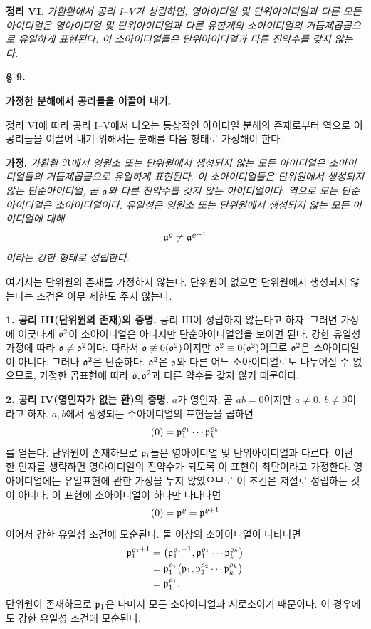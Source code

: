 \textbf{정리 VI.} \emph{가환환에서 공리 I--V가 성립하면, 영아이디얼 및 단위아이디얼과 다른 모든 아이디얼은 영아이디얼 및 단위아이디얼과 다른 유한개의 소아이디얼의 거듭제곱곱으로 유일하게 표현된다. 이 소아이디얼들은 단위아이디얼과 다른 진약수를 갖지 않는다.}

\begin{center}
{\bfseries\large § 9.\par}
\vspace{0.35em}
{\bfseries\large 가정한 분해에서 공리들을 이끌어 내기.\par}
\end{center}

정리 VI에 따라 공리 I--V에서 나오는 통상적인 아이디얼 분해의 존재로부터 역으로 이 공리들을 이끌어 내기 위해서는 분해를 다음 형태로 가정해야 한다.

\textbf{가정.} \emph{가환환 \(\mathfrak{R}\)에서 영원소 또는 단위원에서 생성되지 않는 모든 아이디얼은 소아이디얼들의 거듭제곱곱으로 유일하게 표현된다. 이 소아이디얼들은 단위원에서 생성되지 않는 단순아이디얼, 곧 \(\mathfrak{o}\)와 다른 진약수를 갖지 않는 아이디얼이다. 역으로 모든 단순아이디얼은 소아이디얼이다. 유일성은 영원소 또는 단위원에서 생성되지 않는 모든 아이디얼에 대해}
\[
        \mathfrak{a}^\varrho\ne\mathfrak{a}^{\varrho+1}
\]
\emph{이라는 강한 형태로 성립한다.}

여기서는 단위원의 존재를 가정하지 않는다. 단위원이 없으면 \glqq{}단위원에서 생성되지 않는다\grqq{}는 조건은 아무 제한도 주지 않는다.

\textbf{1. 공리 III(단위원의 존재)의 증명.} 공리 III이 성립하지 않는다고 하자. 그러면 가정에 어긋나게 \(\mathfrak{o}^2\)이 소아이디얼은 아니지만 단순아이디얼임을 보이면 된다. 강한 유일성 가정에 따라 \(\mathfrak{o}\ne\mathfrak{o}^2\)이다. 따라서 \(\mathfrak{o}\not\equiv0(\mathfrak{o}^2)\)이지만 \(\mathfrak{o}^2\equiv0(\mathfrak{o}^2)\)이므로 \(\mathfrak{o}^2\)은 소아이디얼이 아니다. 그러나 \(\mathfrak{o}^2\)은 단순하다. \(\mathfrak{o}^2\)은 \(\mathfrak{o}\)와 다른 어느 소아이디얼로도 나누어질 수 없으므로, 가정한 곱표현에 따라 \(\mathfrak{o},\mathfrak{o}^2\)과 다른 약수를 갖지 않기 때문이다.

\textbf{2. 공리 IV(영인자가 없는 환)의 증명.} \(a\)가 영인자, 곧 \(ab=0\)이지만 \(a\ne0\), \(b\ne0\)이라고 하자. \(a,b\)에서 생성되는 주아이디얼의 표현들을 곱하면
\[
        (0)=\mathfrak{p}_1^{\varrho_1}\cdots\mathfrak{p}_k^{\varrho_k}
\]
를 얻는다. 단위원이 존재하므로 \(\mathfrak{p}_i\)들은 영아이디얼 및 단위아이디얼과 다르다. 어떤 한 인자를 생략하면 영아이디얼의 진약수가 되도록 이 표현이 최단이라고 가정한다. 영아이디얼에는 유일표현에 관한 가정을 두지 않았으므로 이 조건은 저절로 성립하는 것이 아니다. 이 표현에 소아이디얼이 하나만 나타나면
\[
        (0)=\mathfrak{p}^\varrho=\mathfrak{p}^{\varrho+1}
\]
이어서 강한 유일성 조건에 모순된다. 둘 이상의 소아이디얼이 나타나면
\[
\begin{aligned}
\mathfrak{p}_1^{\varrho_1+1}
 &=\bigl(\mathfrak{p}_1^{\varrho_1+1},
          \mathfrak{p}_1^{\varrho_1}\cdots\mathfrak{p}_k^{\varrho_k}\bigr)\\
 &=\mathfrak{p}_1^{\varrho_1}
   \bigl(\mathfrak{p}_1,\mathfrak{p}_2^{\varrho_2}\cdots\mathfrak{p}_k^{\varrho_k}\bigr)\\
 &=\mathfrak{p}_1^{\varrho_1}.
\end{aligned}
\]
단위원이 존재하므로 \(\mathfrak{p}_1\)은 나머지 모든 소아이디얼과 서로소이기 때문이다. 이 경우에도 강한 유일성 조건에 모순된다.

